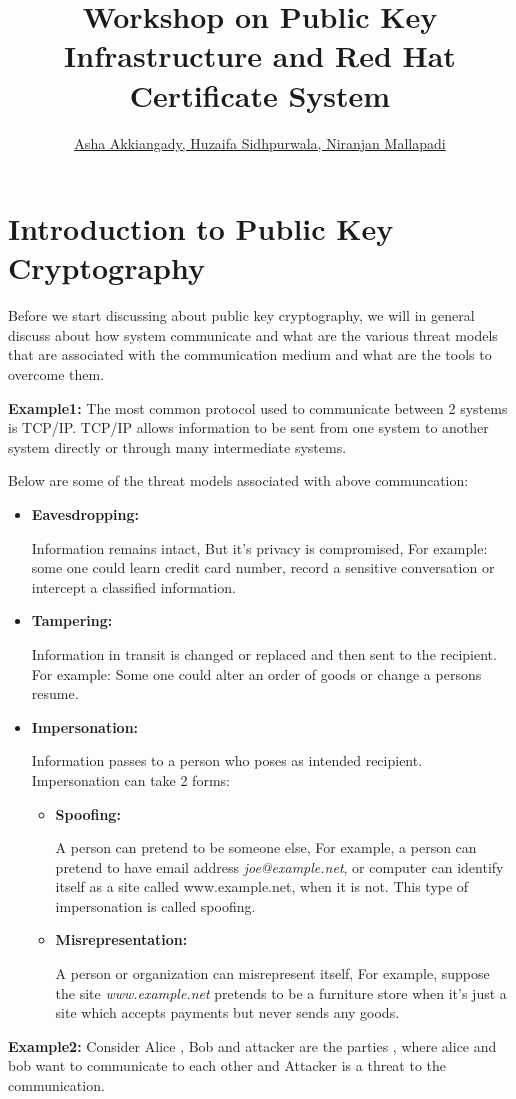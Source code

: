 \documentclass[a4paper]{article}
\title{Workshop on Public Key Infrastructure and Red Hat Certificate System}
\author{\underline{Asha Akkiangady, Huzaifa Sidhpurwala, Niranjan Mallapadi}}
\date{}
\begin{document}
\maketitle
\tableofcontents
\section{Introduction to Public Key Cryptography}
Before we start discussing about public key cryptography, we will in general discuss about how system communicate
and what are the various threat models that are associated with the communication medium and what are the tools to 
overcome them.~\cite{eric}

\textbf{Example1:}
The most common protocol used to communicate between 2 systems is TCP/IP. TCP/IP allows information to be sent 
from one system to another system directly or through many intermediate systems.

Below are some of the threat models associated with above communcation:
\begin{itemize}
    \item \textbf{Eavesdropping:}
        
        Information remains intact, But it's privacy is compromised, For example: some one could learn credit card number, record a sensitive conversation or intercept a
        classified information.
    \item \textbf{Tampering:}

        Information in transit is changed or replaced and then sent to the recipient. For example: Some one could alter an order of goods or change a persons resume.
    \item \textbf{Impersonation:}

        Information passes to a person who poses as intended recipient. Impersonation can take 2 forms:
    \begin{itemize}
        \item \textbf{Spoofing:}

            A person can pretend to be someone else, For example, a person can pretend to have email address \textit{joe@example.net}, 
            or computer can identify itself as a site called www.example.net, when it is not. This type of impersonation is called spoofing.
        \item \textbf{Misrepresentation:}

            A person or organization can misrepresent itself, For example, suppose the site \textit{www.example.net} pretends to be a 
            furniture store when it's just a site which accepts payments but never sends any goods.
    \end{itemize}
\end{itemize}
\textbf{Example2:}
Consider Alice , Bob and attacker are the parties , where alice and bob want to communicate 
to each other and Attacker is a threat to the communication.~\cite{eric}
\end{document}
